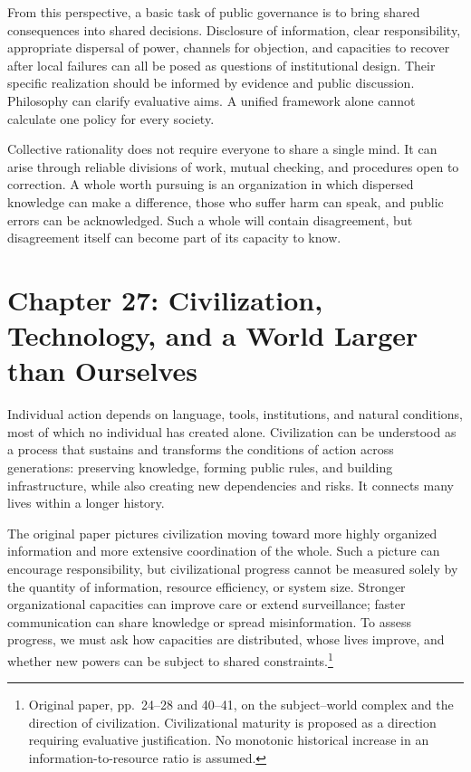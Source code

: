 \documentclass[
  english,
  11pt,
  oneside]{book}
\begin{document}
From this perspective, a basic task of public governance is to bring shared consequences into shared decisions. Disclosure of information, clear responsibility, appropriate dispersal of power, channels for objection, and capacities to recover after local failures can all be posed as questions of institutional design. Their specific realization should be informed by evidence and public discussion. Philosophy can clarify evaluative aims. A unified framework alone cannot calculate one policy for every society.

\begingroup{}

Collective rationality does not require everyone to share a single mind. It can arise through reliable divisions of work, mutual checking, and procedures open to correction. A whole worth pursuing is an organization in which dispersed knowledge can make a difference, those who suffer harm can speak, and public errors can be acknowledged. Such a whole will contain disagreement, but disagreement itself can become part of its capacity to know.

\par\endgroup

\chapter{Chapter 27: Civilization, Technology, and a World Larger than Ourselves}\label{ph-ch-27}

Individual action depends on language, tools, institutions, and natural conditions, most of which no individual has created alone. Civilization can be understood as a process that sustains and transforms the conditions of action across generations: preserving knowledge, forming public rules, and building infrastructure, while also creating new dependencies and risks. It connects many lives within a longer history.

The original paper pictures civilization moving toward more highly organized information and more extensive coordination of the whole. Such a picture can encourage responsibility, but civilizational progress cannot be measured solely by the quantity of information, resource efficiency, or system size. Stronger organizational capacities can improve care or extend surveillance; faster communication can share knowledge or spread misinformation. To assess progress, we must ask how capacities are distributed, whose lives improve, and whether new powers can be subject to shared constraints.\footnote{\hypertarget{ph-note-62}{}Original paper, pp.~24--28 and 40--41, on the subject--world complex and the direction of civilization. Civilizational maturity is proposed as a direction requiring evaluative justification. No monotonic historical increase in an information-to-resource ratio is assumed.}
\end{document}
